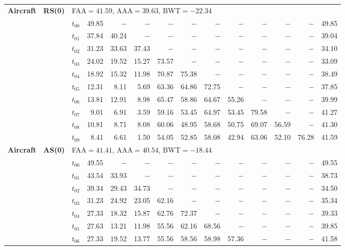 \begin{table}[ht]
\begin{tabular}{@{}l l l *{11}{r}@{}}
\midrule
\multirow{11}{*}{\textbf{Aircraft}} & \multirow{11}{*}{\textbf{RS(0)}} & \multicolumn{12}{l}{\quad\small FAA$=41.59$,\; AAA$=39.63$,\; BWT$=-22.34$} \\
 & & $t_{00}$ & 49.85 & $-$ & $-$ & $-$ & $-$ & $-$ & $-$ & $-$ & $-$ & $-$ & 49.85 \\
 & & $t_{01}$ & 37.84 & 40.24 & $-$ & $-$ & $-$ & $-$ & $-$ & $-$ & $-$ & $-$ & 39.04 \\
 & & $t_{02}$ & 31.23 & 33.63 & 37.43 & $-$ & $-$ & $-$ & $-$ & $-$ & $-$ & $-$ & 34.10 \\
 & & $t_{03}$ & 24.02 & 19.52 & 15.27 & 73.57 & $-$ & $-$ & $-$ & $-$ & $-$ & $-$ & 33.09 \\
 & & $t_{04}$ & 18.92 & 15.32 & 11.98 & 70.87 & 75.38 & $-$ & $-$ & $-$ & $-$ & $-$ & 38.49 \\
 & & $t_{05}$ & 12.31 & 8.11 & 5.69 & 63.36 & 64.86 & 72.75 & $-$ & $-$ & $-$ & $-$ & 37.85 \\
 & & $t_{06}$ & 13.81 & 12.91 & 8.98 & 65.47 & 58.86 & 64.67 & 55.26 & $-$ & $-$ & $-$ & 39.99 \\
 & & $t_{07}$ & 9.01 & 6.91 & 3.59 & 59.16 & 53.45 & 64.97 & 53.45 & 79.58 & $-$ & $-$ & 41.27 \\
 & & $t_{08}$ & 10.81 & 8.71 & 8.08 & 60.06 & 48.95 & 58.68 & 50.75 & 69.07 & 56.59 & $-$ & 41.30 \\
 & & $t_{09}$ & 8.41 & 6.61 & 1.50 & 54.05 & 52.85 & 58.08 & 42.94 & 63.06 & 52.10 & 76.28 & 41.59 \\
\midrule
\multirow{11}{*}{\textbf{Aircraft}} & \multirow{11}{*}{\textbf{AS(0)}} & \multicolumn{12}{l}{\quad\small FAA$=41.41$,\; AAA$=40.54$,\; BWT$=-18.44$} \\
 & & $t_{00}$ & 49.55 & $-$ & $-$ & $-$ & $-$ & $-$ & $-$ & $-$ & $-$ & $-$ & 49.55 \\
 & & $t_{01}$ & 43.54 & 33.93 & $-$ & $-$ & $-$ & $-$ & $-$ & $-$ & $-$ & $-$ & 38.73 \\
 & & $t_{02}$ & 39.34 & 29.43 & 34.73 & $-$ & $-$ & $-$ & $-$ & $-$ & $-$ & $-$ & 34.50 \\
 & & $t_{03}$ & 31.23 & 24.92 & 23.05 & 62.16 & $-$ & $-$ & $-$ & $-$ & $-$ & $-$ & 35.34 \\
 & & $t_{04}$ & 27.33 & 18.32 & 15.87 & 62.76 & 72.37 & $-$ & $-$ & $-$ & $-$ & $-$ & 39.33 \\
 & & $t_{05}$ & 27.63 & 13.21 & 11.98 & 55.56 & 62.16 & 68.56 & $-$ & $-$ & $-$ & $-$ & 39.85 \\
 & & $t_{06}$ & 27.33 & 19.52 & 13.77 & 55.56 & 58.56 & 58.98 & 57.36 & $-$ & $-$ & $-$ & 41.58 \\

\end{tabular}
\end{table}
